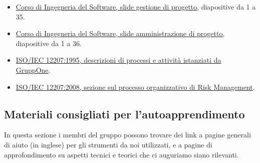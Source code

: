 \documentclass[../norme-di-progetto.tex]{subfiles}
\begin{document}
\begin{itemize}
  \item \href{https://www.math.unipd.it/~tullio/IS-1/2019/Dispense/L06.pdf}{Corso di Ingegneria del Software, slide gestione di progetto}, diapositive da 1 a 35.
  \item \href{https://www.math.unipd.it/~tullio/IS-1/2019/Dispense/FC01.pdf}{Corso di Ingegneria del Software, slide amministrazione di progetto}, diapositive da 1 a 36.
  \item \href{https://www.math.unipd.it/~tullio/IS-1/2009/Approfondimenti/ISO_12207-1995.pdf}{ISO/IEC 12207:1995, descrizioni di processi e attività istanziati da GruppOne}.
  \item \href{https://www.iso.org/standard/43447.html}{ISO/IEC 12207:2008, sezione sul processo organizzativo di Risk Management}.
\end{itemize}

\subsection{Materiali consigliati per l'autoapprendimento}%
\label{sub:materiali_consigliati_per_l_autoapprendimento}

In questa sezione i membri del gruppo possono trovare dei link a pagine generali di aiuto (in inglese) per gli strumenti da noi utilizzati, e a pagine di approfondimento su aspetti tecnici e teorici che ci auguriamo siano rilevanti.
\end{document}
